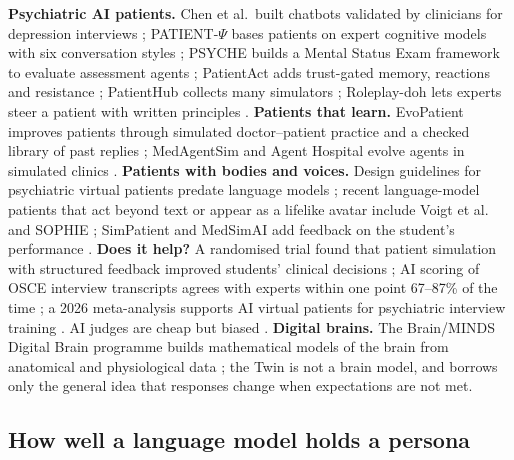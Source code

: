 \documentclass[journal]{IEEEtran}
\begin{document}
\textbf{Psychiatric AI patients.} Chen et al.\ built chatbots validated by clinicians for depression interviews \cite{chen2023llmempowered};
PATIENT-$\Psi$ bases patients on expert cognitive models with six conversation styles \cite{wang2024patient}; PSYCHE builds a Mental Status Exam
framework to evaluate assessment agents \cite{lee2025psyche}; PatientAct adds trust-gated memory, reactions and resistance \cite{sabour2026patientact};
PatientHub collects many simulators \cite{sabour2026patienthub}; Roleplay-doh lets experts steer a patient with written principles
\cite{louie2024roleplaydoh}. \textbf{Patients that learn.} EvoPatient improves patients through simulated doctor--patient practice and a checked
library of past replies \cite{du2024llms}; MedAgentSim and Agent Hospital evolve agents in simulated clinics \cite{almansoori2025selfevolving,li2024agent}.
\textbf{Patients with bodies and voices.} Design guidelines for psychiatric virtual patients predate language models \cite{dupuy2020guidelines};
recent language-model patients that act beyond text or appear as a lifelike avatar include Voigt et al.\ \cite{voigt2025llmpowered} and
SOPHIE \cite{haut2025ai}; SimPatient and MedSimAI add feedback
on the student's performance \cite{steenstra2025scaffolding,hicke2025medsimai}. \textbf{Does it help?} A randomised trial found that patient simulation
with structured feedback improved students' clinical decisions \cite{brugge2024llm}; AI scoring of OSCE interview transcripts agrees with experts
within one point 67--87\% of the time \cite{geathers2025benchmarking}; a 2026 meta-analysis supports AI virtual patients for psychiatric interview training
\cite{kilincel2026meta}. AI judges are cheap but biased \cite{zheng2023judging}. \textbf{Digital brains.} The Brain/MINDS Digital Brain programme
builds mathematical models of the brain from anatomical and physiological data \cite{brainminds}; the Twin is not a brain model, and borrows
only the general idea that responses change when expectations are not met.


\subsection{How well a language model holds a persona}
\end{document}
